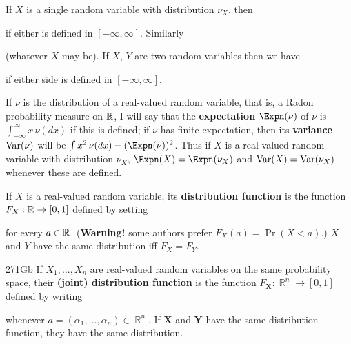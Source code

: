  If $X$ is a single random variable with
distribution $\nu_{X}$, then


\noindent if either is defined in $[-\infty,\infty]$.   Similarly


\noindent (whatever $X$ may be).   If $X$, $Y$ are two random
variables then we have


\noindent if either side is defined in $[-\infty,\infty]$.

\medskip

 If $\nu$ is the distribution of a
real-valued random variable, that is, a Radon probability measure
on $\Bbb R$, I will say that the {\bf expectation} $\Expn(\nu)$ of $\nu$ is
$\int_{-\infty}^{\infty}x\,\nu(dx)$ if this is defined;  if $\nu$ has
finite expectation, then its {\bf variance} $\mathop{\text{Var}}(\nu)$ will be
$\int x^2\,\nu(dx)-(\Expn(\nu))^2$.   Thus if $X$ is a real-valued random
variable with distribution $\nu_X$, $\Expn(X)=\Expn(\nu_X)$ and
$\mathop{\text{Var}}(X)=\mathop{\text{Var}}(\nu_X)$ whenever these are defined.

 If $X$ is a real-valued random
variable, its {\bf distribution
function} is the function $F_X:\Bbb R\to[0,1]$ defined by setting


\noindent for every $a\in\Bbb R$.    ({\bf Warning!}  some authors
prefer $F_X(a)=\Pr(X<a)$.)    $X$ and $Y$ have the same
distribution iff $F_X=F_Y$.

\spheader 271Gb
If $X_1,\ldots,X_n$ are real-valued random variables on the same
probability space, their {\bf (joint) distribution function} is the
function $F_{\pmb{X}}:\BbbR^n\to[0,1]$ defined by writing


\noindent whenever $a=(\alpha_1,\ldots,\alpha_n)\in\BbbR^n$.   If
$\pmb{X}$ and $\pmb{Y}$ have the same distribution function, they have
the same distribution.

